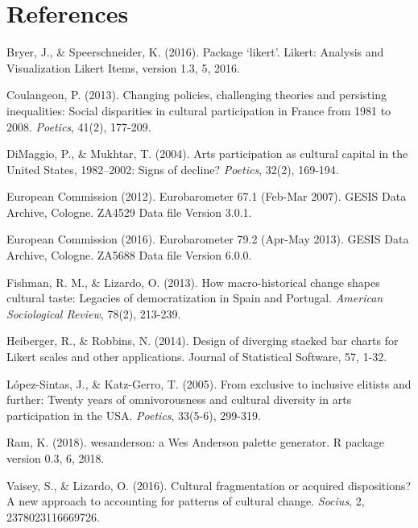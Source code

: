 \documentclass{article}
\begin{document}
\newpage
\section*{References}
\noindent

Bryer, J., \& Speerschneider, K. (2016). Package ‘likert’. Likert: Analysis and Visualization Likert Items, version 1.3, 5, 2016.

Coulangeon, P. (2013). Changing policies, challenging theories and persisting inequalities: Social disparities in cultural participation in France from 1981 to 2008. \textit{Poetics}, 41(2), 177-209.

DiMaggio, P., \& Mukhtar, T. (2004). Arts participation as cultural capital in the United States, 1982–2002: Signs of decline? \textit{Poetics}, 32(2), 169-194.

European Commission (2012). Eurobarometer 67.1 (Feb-Mar 2007). GESIS Data Archive, Cologne. ZA4529 Data file Version 3.0.1. 

European Commission (2016). Eurobarometer 79.2 (Apr-May 2013). GESIS Data Archive, Cologne. ZA5688 Data file Version 6.0.0.

Fishman, R. M., \& Lizardo, O. (2013). How macro-historical change shapes cultural taste: Legacies of democratization in Spain and Portugal. \textit{American Sociological Review}, 78(2), 213-239.

Heiberger, R., \& Robbins, N. (2014). Design of diverging stacked bar charts for Likert scales and other applications. Journal of Statistical Software, 57, 1-32.

López-Sintas, J., \& Katz-Gerro, T. (2005). From exclusive to inclusive elitists and further: Twenty years of omnivorousness and cultural diversity in arts participation in the USA. \textit{Poetics}, 33(5-6), 299-319.

Ram, K. (2018). wesanderson: a Wes Anderson palette generator. R package version 0.3, 6, 2018.

Vaisey, S., \& Lizardo, O. (2016). Cultural fragmentation or acquired dispositions? A new approach to accounting for patterns of cultural change. \textit{Socius}, 2, 2378023116669726.
\end{document}
